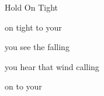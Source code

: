 \begin{SBSong}{Hold On Tight}
\begin{SBVerse}
     on tight to your 
	
     you see the  falling
	
	 you hear that  wind calling
	
	 on  to your 
  \end{SBVerse}
\end{SBSong}